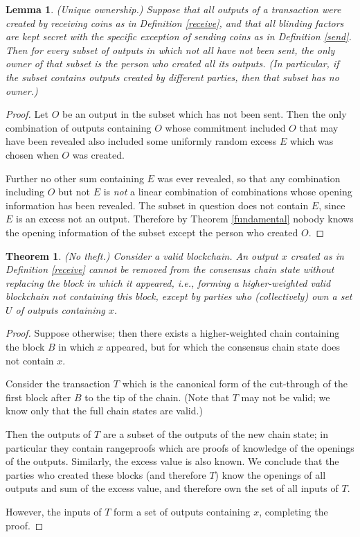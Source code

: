 \documentclass[letterpaper]{article}
\newtheorem{lmma}{Lemma}
\newtheorem{thrm}{Theorem}
\begin{document}
\begin{lmma} (Unique ownership.) Suppose that all outputs of a transaction
were created by receiving coins as in Definition \ref{receive}, and that all
blinding factors are kept secret with the specific exception of sending
coins as in Definition \ref{send}. Then for every subset of outputs in which
not all have not been sent, the only owner of that subset is the person
who created all its outputs. (In particular, if the subset contains outputs
created by different parties, then that subset has no owner.)
\label{unique}
\end{lmma}
\begin{proof} Let $O$ be an output in the subset which has not been sent.
Then the only combination of outputs containing $O$ whose commitment included
$O$ that may have been revealed also included some uniformly random excess
$E$ which was chosen when $O$ was created.

Further no other sum containing $E$ was ever revealed, so that any combination
including $O$ but not $E$ is \emph{not} a linear combination of combinations
whose opening information has been revealed. The subset in question does not
contain $E$, since $E$ is an excess not an output. Therefore by Theorem
\ref{fundamental} nobody knows the opening information of the subset except
the person who created $O$.
\end{proof}

\begin{thrm} (No theft.) Consider a valid blockchain. An output $x$
created as in Definition \ref{receive} cannot be removed from the
consensus chain state without replacing the block in which it appeared,
\emph{i.e.}, forming a higher-weighted valid blockchain not containing
this block, except by parties who (collectively) own a set $U$ of
outputs containing $x$.
\end{thrm}
\begin{proof} Suppose otherwise; then there exists a higher-weighted
chain containing the block $B$ in which $x$ appeared, but for which
the consensus chain state does not contain $x$.

Consider the transaction $T$ which is the canonical form of the
cut-through of the first block after $B$ to the tip of the chain.
(Note that $T$ may not be valid; we know only that the full chain
states are valid.)

Then the outputs of $T$ are a subset of the outputs of the new
chain state; in particular they contain rangeproofs which are
proofs of knowledge of the openings of the outputs. Similarly, the
excess value is also known. We conclude that the parties who created
these blocks (and therefore $T$) know the openings of all outputs and
sum of the excess value, and therefore own the set of all inputs of $T$.

However, the inputs of $T$ form a set of outputs containing $x$,
completing the proof.
\end{proof}
\end{document}
